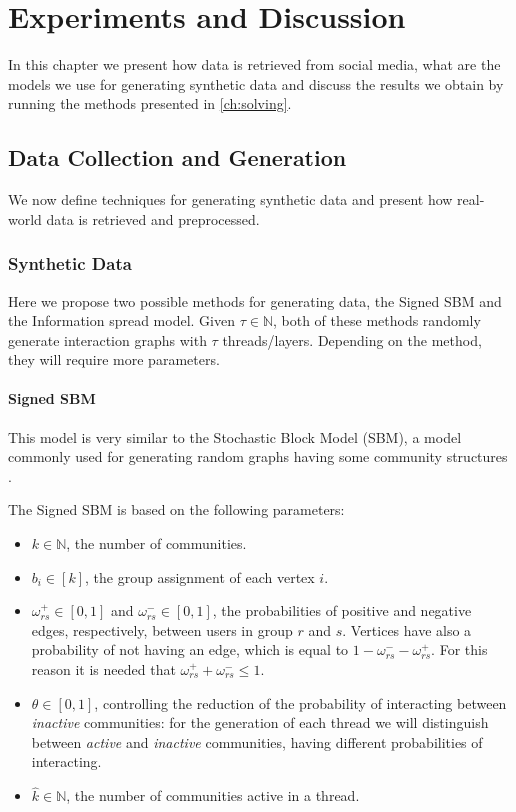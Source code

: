 \chapter{Experiments and Discussion}
\label{ch:resultsAndAnalysis}

In this chapter we present how data is retrieved from social media,
what are the models we use for generating synthetic data and discuss the
results we obtain by running the methods presented in
\autoref{ch:solving}.

\section{Data Collection and Generation}%
\label{sec:data_collection_and_generation}

We now define techniques for generating synthetic data and present how real-world data is retrieved and preprocessed.

\subsection{Synthetic Data}%
\label{sub:synthetic_data}

Here we propose two possible methods for generating data, the Signed SBM and
the Information spread model. Given $\tau \in \mathbb{N}$, both of these methods randomly generate
interaction graphs with $\tau$ threads/layers.
Depending on the method, they will require more parameters.

\subsubsection{Signed SBM}%
\label{ssub:signed_sbm}

This model is very similar to the Stochastic Block Model (SBM), a model
commonly used for generating random graphs having some community structures
\cite{Newman2018}.

The Signed SBM is based on the following parameters:
\begin{itemize}
	\item $k \in \mathbb{N}$, the number of communities.
	\item $b_{i} \in [k]$, the group assignment of each vertex $i$.
	\item $\omega ^{+} _{rs} \in [0, 1]$ and $\omega ^{-} _{rs} \in [0, 1]$, the probabilities
	      of positive and negative edges, respectively, between users in
	      group $r$ and $s$. Vertices have also a probability of not having an
	      edge, which is equal to $1 - \omega ^{-} _{rs} - \omega ^{+} _{rs} $.
	      For this reason it is needed that $\omega ^{+} _{rs} + \omega ^{-} _{rs} \leq 1$.
	\item $\theta \in [0, 1]$, controlling the reduction of the probability of interacting
	      between \emph{inactive} communities: for the generation of each
	      thread we will distinguish between \emph{active} and \emph{inactive}
	      communities, having different probabilities of interacting.
	\item $\hat{k} \in \mathbb{N}$, the number of communities active in
	      a thread.
\end{itemize}

